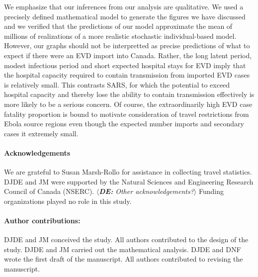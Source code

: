 \documentclass[12pt]{article}
\newcommand{\de}[1]{$\langle${\footnotesize{\color{cyan}\slshape{\bfseries DE:} #1}$\rangle$}}
\begin{document}
We emphasize that our inferences from our analysis are qualitative.  We used a precisely defined mathematical model to generate the figures we have discussed and we verified that the predictions of our model approximate the mean of millions of realizations of a more realistic stochastic individual-based model.  However, our graphs should not be interpretted as precise predictions of what to expect if there were an EVD import into Canada.  Rather, the long latent period, modest infectious period and short expected hospital stays for EVD imply that the hospital capacity required to contain transmission from imported EVD cases is relatively small.  This contrasts SARS, for which the potential to exceed hospital capacity and thereby lose the ability to contain transmission effectively is more likely to be a serious concern.  Of course, the extraordinarily high EVD case fatality proportion is bound to motivate consideration of travel restrictions from Ebola source regions even though the expected number imports and secondary cases it extremely small.

\newpage
\paragraph*{Acknowledgements}

We are grateful to Susan Marsh-Rollo for assistance in collecting travel statistics.  DJDE and JM were supported by the Natural Sciences and Engineering Research Council of Canada (NSERC).
\de{Other acknowledgements?}
Funding organizations played no role in this study.


\paragraph*{Author contributions:}
DJDE and JM conceived the study.  All authors contributed to the design of the study.  DJDE and JM carried out the mathematical analysis.  DJDE and DNF wrote the first draft of the manuscript.  All authors contributed to revising the manuscript.
\end{document}
